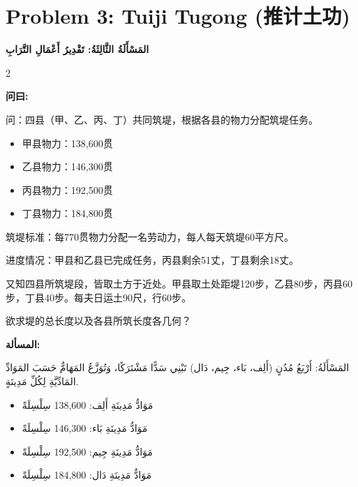 \documentclass[11pt,a4paper]{article}
\newcommand{\ar}[1]{\arabicfont\beginR #1\endR}
\newcommand{\zhtext}[1]{{\chinese #1}}
\newenvironment{bilingual}{%
  \begin{paracol}{2}
}{%
  \end{paracol}
}
\newcommand{\cnlabel}[1]{\textcolor{algocolor}{\textbf{#1}}}
\newcommand{\arlabel}[1]{\ar{\textcolor{algocolor}{\textbf{#1}}}}
\begin{document}
\newpage

\section{Problem 3: Tuiji Tugong (\zhtext{推计土功})}
\ar{\textbf{المَسْأَلَةُ الثَّالِثَةُ: تَقْدِيرُ أَعْمَالِ التَّرَابِ}}

\begin{bilingual}

\begin{leftcolumn*}
\cnlabel{问曰:}

问：四县（甲、乙、丙、丁）共同筑堤，根据各县的物力分配筑堤任务。

\begin{itemize}
  \item 甲县物力：138,600贯
  \item 乙县物力：146,300贯
  \item 丙县物力：192,500贯
  \item 丁县物力：184,800贯
\end{itemize}

筑堤标准：每770贯物力分配一名劳动力，每人每天筑堤60平方尺。

进度情况：甲县和乙县已完成任务，丙县剩余51丈，丁县剩余18丈。

又知四县所筑堤段，皆取土方于近处。甲县取土处距堤120步，乙县80步，丙县60步，丁县40步。每夫日运土90尺，行60步。

欲求堤的总长度以及各县所筑长度各几何？
\end{leftcolumn*}

\begin{rightcolumn*}
\arlabel{المسألة:}

\ar{المَسْأَلَةُ: أَرْبَعُ مُدُنٍ (أَلِف، بَاء، جِيم، دَال) تَبْنِي سَدًّا مَشْتَرَكًا، وَتُوَزَّعُ المَهَامُّ حَسَبَ المَوَادِّ المَادِّيَّةِ لِكُلِّ مَدِينَةٍ.}

\begin{itemize}
  \item \ar{مَوَادُّ مَدِينَةِ أَلِف: 138,600 سِلْسِلَةً}
  \item \ar{مَوَادُّ مَدِينَةِ بَاء: 146,300 سِلْسِلَةً}
  \item \ar{مَوَادُّ مَدِينَةِ جِيم: 192,500 سِلْسِلَةً}
  \item \ar{مَوَادُّ مَدِينَةِ دَال: 184,800 سِلْسِلَةً}
\end{itemize}


\end{rightcolumn*}
\end{bilingual}
\end{document}
